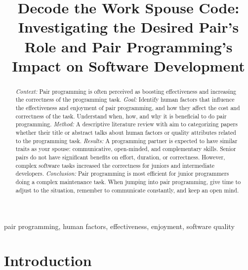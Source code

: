 \documentclass[conference]{IEEEtran}
\begin{document}
\title{Decode the Work Spouse Code: Investigating the Desired Pair's Role and Pair Programming's Impact on Software Development}


\author{
}

\maketitle

\begin{abstract}
\textit{Context:} Pair programming is often perceived as boosting effectiveness and increasing the correctness of the programming task.
\textit{Goal:} Identify human factors that influence the effectiveness and enjoyment of pair programming, and how they affect the cost and correctness of the task. Understand when, how, and why it is beneficial to do pair programming.
\textit{Method:} A descriptive literature review with aim to categorizing papers whether their title or abstract talks about human factors or quality attributes related to the programming task.
\textit{Results:} A programming partner is expected to have similar traits as your spouse: communicative, open-minded, and complementary skills. Senior pairs do not have significant benefits on effort, duration, or correctness. However, complex software tasks increased the correctness for juniors and intermediate developers. 
\textit{Conclusion:} Pair programming is most efficient for junior programmers doing a complex maintenance task. When jumping into pair programming, give time to adjust to the situation, remember to communicate constantly, and keep an open mind.
\end{abstract}

\begin{IEEEkeywords}
pair programming, human factors, effectiveness, enjoyment, software quality
\end{IEEEkeywords}

\section{Introduction}
\end{document}
